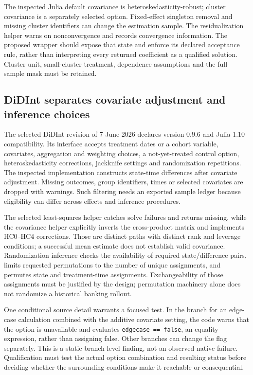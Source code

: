 The inspected Julia default covariance is heteroskedasticity-robust; cluster
covariance is a separately selected option. Fixed-effect singleton removal
and missing cluster identifiers can change the estimation sample. The
residualization helper warns on nonconvergence and records convergence
information. The proposed wrapper should expose that state and enforce its
declared acceptance rule, rather than interpreting every returned coefficient
as a qualified solution. Cluster unit, small-cluster treatment, dependence
assumptions and the full sample mask must be retained.~\citep{exec25_panelother_julia}

\subsection{DiDInt separates covariate adjustment and inference choices}
The selected DiDInt revision of 7 June 2026 declares version 0.9.6 and Julia
1.10 compatibility. Its interface accepts treatment dates or a cohort
variable, covariates, aggregation and weighting choices, a not-yet-treated
control option, heteroskedasticity corrections, jackknife settings and
randomization repetitions. The inspected implementation constructs
state-time differences after covariate adjustment. Missing outcomes, group
identifiers, times or selected covariates are dropped with warnings. Such
filtering needs an exported sample ledger because eligibility can differ
across effects and inference procedures.~\citep{exec25_panelother_didint}

The selected least-squares helper catches solve failures and returns missing,
while the covariance helper explicitly inverts the cross-product matrix and
implements HC0--HC4 corrections. Those are distinct paths with distinct
rank and leverage conditions; a successful mean estimate does not establish
valid covariance. Randomization inference checks the availability of
required state/difference pairs, limits requested permutations to the number
of unique assignments, and permutes state and treatment-time assignments.
Exchangeability of those assignments must be justified by the design;
permutation machinery alone does not randomize a historical banking rollout.
\citep{exec25_panelother_didint,exec25_panelother_choice}

One conditional source detail warrants a focused test. In the branch for
an edge-case calculation combined with the additive covariate setting, the
code warns that the option is unavailable and evaluates
\texttt{edgecase == false}, an equality expression, rather than assigning
false. Other branches can change the flag separately. This is a static
branch-level finding, not an observed native failure. Qualification must
test the actual option combination and resulting status before deciding
whether the surrounding conditions make it reachable or consequential.
\citep{exec25_panelother_didint}

